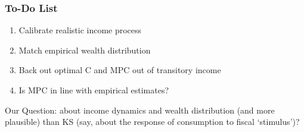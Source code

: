 \begin{comment}
\end{frame}



\begin{frame}
\frametitle{Our Goal: ``Serious'' Microfoundations}

Requires three changes to well-known \jemph{Krusell--Smith (1998)} model: \pause
\begin{enumerate}
\item Sensible microeconomic income process: Friedman
\item Finite lifetimes: Blanchard
\item Match wealth \jemph{distribution}
\bi
\item Here, achieved by preference heterogeneity
\item View it as a proxy for many kinds of heterogeneity
\bi
\item Age
\item Growth
\item Risk aversion
\item \dots
\ei
\ei
\end{enumerate}
\end{frame}
\end{comment}




\begin{frame}
\frametitle{{To-Do List}}


\begin{enumerate}
\item Calibrate realistic income process
\item Match empirical wealth distribution
\item Back out optimal C and MPC out of transitory income
\item Is MPC in line with empirical estimates?
\end{enumerate}


\begin{block}{Our Question:}
 about income dynamics and wealth distribution  (and more plausible)  than KS  (say, about the response of consumption to fiscal `stimulus')?
\end{block}
\end{frame}



